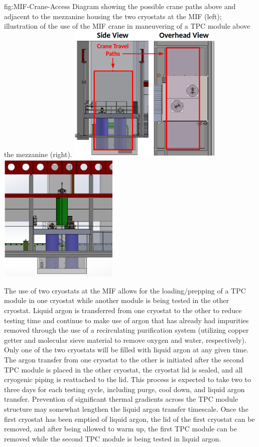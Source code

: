 \begin{dunefigure}{fig:MIF-Crane-Access}
{Diagram showing the possible crane paths above and adjacent to the mezzanine housing the two cryostats at the MIF (left); illustration of the use of the MIF crane in maneuvering of a TPC module above the mezzanine (right).}
\includegraphics[width=0.560\textwidth]{graphics/lartpc/Construction/MIF-Crane-Access.png}
\includegraphics[width=0.432\textwidth]{graphics/lartpc/Construction/MIF-Module-Lift.png}
\end{dunefigure}

The use of two cryostats at the MIF allows for the loading/prepping of a TPC module in one cryostat while another module is being tested in the other cryostat.  Liquid argon is transferred from one cryostat to the other to reduce testing time and continue to make use of argon that has already had impurities removed through the use of a recirculating purification system (utilizing copper getter and molecular sieve material to remove oxygen and water, respectively).  Only one of the two cryostats will be filled with liquid argon at any given time.  The argon transfer from one cryostat to the other is initiated after the second TPC module is placed in the other cryostat, the cryostat lid is sealed, and all cryogenic piping is reattached to the lid.  This process is expected to take two to three days for each testing cycle, including purge, cool down, and liquid argon transfer.  Prevention of significant thermal gradients across the TPC module structure may somewhat lengthen the liquid argon transfer timescale.  Once the first cryostat has been emptied of liquid argon, the lid of the first cryostat can be removed, and after being allowed to warm up, the first TPC module can be removed while the second TPC module is being tested in liquid argon.

